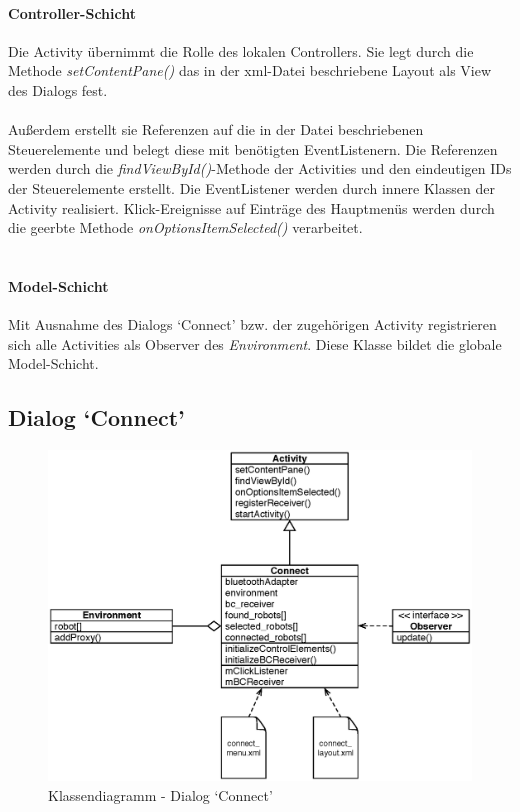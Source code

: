 \documentclass[10pt,a4paper]{article}
\begin{document}
	\paragraph*{Controller-Schicht} Die Activity übernimmt die Rolle des lokalen Controllers. Sie legt durch die Methode \textit{setContentPane()}
	das in der xml-Datei beschriebene Layout als View des Dialogs fest. \\ \\ 
	Außerdem erstellt sie Referenzen auf die in der Datei beschriebenen Steuerelemente und belegt diese mit benötigten EventListenern. Die Referenzen
	werden durch die \textit{findViewById()}-Methode der Activities und den eindeutigen IDs der Steuerelemente erstellt. Die EventListener werden
	durch innere Klassen der Activity realisiert. Klick-Ereignisse auf Einträge des Hauptmenüs werden durch die geerbte Methode 
	\textit{onOptionsItemSelected()} verarbeitet. \\ \\
	
	\paragraph*{Model-Schicht}
	Mit Ausnahme des Dialogs `Connect' bzw. der zugehörigen Activity registrieren sich alle Activities als Observer des \textit{Environment}. Diese
	Klasse bildet die globale Model-Schicht.
	
	\subsection*{Dialog `Connect'}
	
	\begin{figure}[h]
			\centering
			\includegraphics[width=14cm]{images/entwurf_connect.eps}
  			\caption{Klassendiagramm - Dialog `Connect'}
  			\label{fig:dialog_connect}
  	\end{figure}
	
\end{document}
